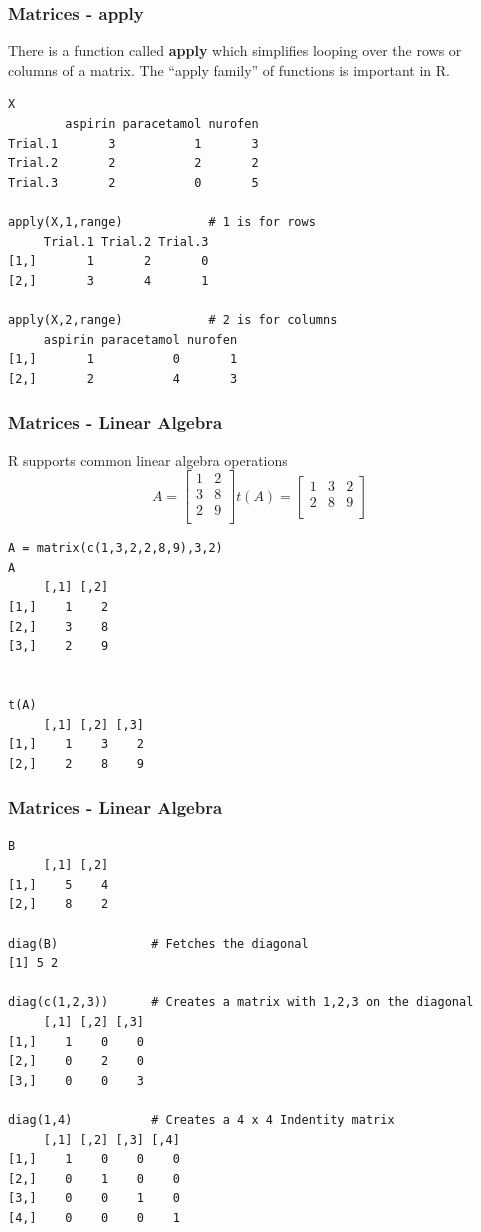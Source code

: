 \documentclass{beamer}
\begin{document}
%

\begin{frame}[fragile]
\frametitle{Matrices - apply}
There is a function called \textbf{apply} which simplifies looping over the rows or columns of a matrix. The ``apply family'' of functions is important in R.
\footnotesize
\begin{verbatim}
X
        aspirin paracetamol nurofen
Trial.1       3           1       3
Trial.2       2           2       2
Trial.3       2           0       5

apply(X,1,range)            # 1 is for rows
     Trial.1 Trial.2 Trial.3
[1,]       1       2       0
[2,]       3       4       1

apply(X,2,range)            # 2 is for columns
     aspirin paracetamol nurofen
[1,]       1           0       1
[2,]       2           4       3
\end{verbatim}
\end{frame}

%

\begin{frame}[fragile]
\frametitle{Matrices - Linear Algebra}
R supports common linear algebra operations
\footnotesize
\begin{equation}
A = \begin{bmatrix}
       1 & 2 \\[0.3em]
       3 & 8 \\[0.3em]
       2 & 9 \\
     \end{bmatrix}
t(A) = \begin{bmatrix}
        1 & 3 & 2 \\[0.3em]
        2 & 8 & 9 \\[0.3em]
       \end{bmatrix}
\end{equation}
\footnotesize
\begin{verbatim}
A = matrix(c(1,3,2,2,8,9),3,2)
A
     [,1] [,2]
[1,]    1    2
[2,]    3    8
[3,]    2    9


t(A)
     [,1] [,2] [,3]
[1,]    1    3    2
[2,]    2    8    9

\end{verbatim}
\end{frame}


%

\begin{frame}[fragile]
\frametitle{Matrices - Linear Algebra}
\scriptsize
\begin{verbatim}
B
     [,1] [,2]
[1,]    5    4
[2,]    8    2

diag(B)             # Fetches the diagonal
[1] 5 2

diag(c(1,2,3))      # Creates a matrix with 1,2,3 on the diagonal
     [,1] [,2] [,3]
[1,]    1    0    0
[2,]    0    2    0
[3,]    0    0    3

diag(1,4)           # Creates a 4 x 4 Indentity matrix
     [,1] [,2] [,3] [,4]
[1,]    1    0    0    0
[2,]    0    1    0    0
[3,]    0    0    1    0
[4,]    0    0    0    1
\end{verbatim}
\end{frame}
\end{document}
